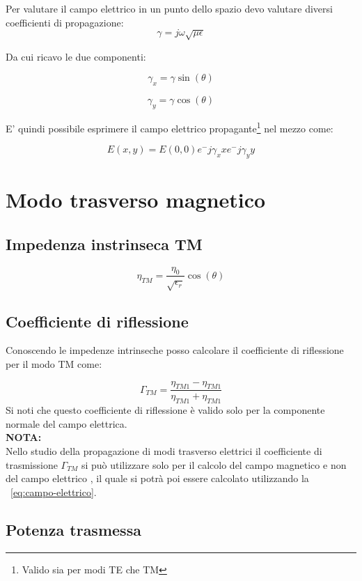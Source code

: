 \documentclass[10pt,a4paper]{report}
\begin{document}
			Per valutare il campo elettrico in un punto dello spazio devo valutare diversi coefficienti di propagazione:
			\[
			\gamma=j\omega\sqrt{\mu\epsilon}\]

			Da cui ricavo le due componenti:

			\[
			\gamma_x=\gamma\sin(\theta)
			\]

			\[
			\gamma_y=\gamma\cos(\theta)
			\]

			E' quindi possibile esprimere il campo elettrico propagante\footnote{Valido sia per modi TE che TM} nel mezzo come:
			
			\[
			E(x,y)=E(0,0)e^-{j\gamma_x x}e^-{j\gamma_y y}
			\]
		

	\section{Modo trasverso magnetico}

			\subsection{Impedenza instrinseca TM}

				\begin{equation}
					\eta_{TM}=\frac{\eta_0}{\sqrt{\epsilon_r}}\cos(\theta)
				\end{equation}


		\subsection{Coefficiente di riflessione}
			Conoscendo le impedenze intrinseche posso calcolare il coefficiente di riflessione per il modo TM come:

			\[
			\Gamma_{TM}=\frac{\eta_{TM1}-\eta_{TM1}}{\eta_{TM1}+\eta_{TM1}}
			\]
			 Si noti che questo coefficiente di riflessione è valido solo per la componente normale del campo elettrica.
			 \\
			 \textbf{NOTA:}
			 \\ 
			 Nello studio della propagazione di modi trasverso elettrici il coefficiente di trasmissione $\Gamma_{TM}$ si può utilizzare solo per il calcolo del campo magnetico e non del campo elettrico , il quale si potrà poi essere calcolato utilizzando la ~\ref{eq:campo-elettrico}.

		\subsection{Potenza trasmessa}
\end{document}
